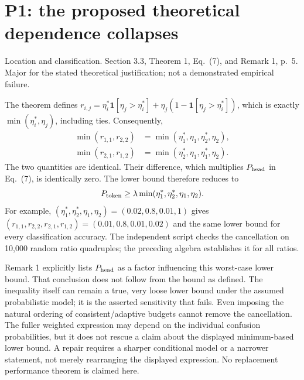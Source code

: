 \documentclass[10pt]{article}
\begin{document}
\section*{P1: the proposed theoretical dependence collapses}
Location and classification. Section 3.3, Theorem 1, Eq. (7), and Remark 1, p. 5. Major for the stated theoretical justification; not a demonstrated empirical failure.\par
The theorem defines \(r_{i,j}=\eta_i^*\mathbf1[\eta_j>\eta_i^*]+\eta_j(1-\mathbf1[\eta_j>\eta_i^*])\), which is exactly \(\min(\eta_i^*,\eta_j)\), including ties. Consequently, \[\begin{aligned}
\min(r_{1,1},r_{2,2})&=\min(\eta_1^*,\eta_1,\eta_2^*,\eta_2),\\
\min(r_{2,1},r_{1,2})&=\min(\eta_2^*,\eta_1,\eta_1^*,\eta_2).\end{aligned}\] The two quantities are identical. Their difference, which multiplies \(P_{\rm head}\) in Eq. (7), is identically zero. The lower bound therefore reduces to \[P_{\rm token}\ge \lambda\min(\eta_1^*,\eta_2^*,\eta_1,\eta_2).\] For example, \((\eta_1^*,\eta_2^*,\eta_1,\eta_2)=(0.02,0.8,0.01,1)\) gives \((r_{1,1},r_{2,2},r_{2,1},r_{1,2})=(0.01,0.8,0.01,0.02)\) and the same lower bound for every classification accuracy. The independent script checks the cancellation on 10,000 random ratio quadruples; the preceding algebra establishes it for all ratios.\par
Remark 1 explicitly lists \(P_{\rm head}\) as a factor influencing this worst-case lower bound. That conclusion does not follow from the bound as defined. The inequality itself can remain a true, very loose lower bound under the assumed probabilistic model; it is the asserted sensitivity that fails. Even imposing the natural ordering of consistent/adaptive budgets cannot remove the cancellation. The fuller weighted expression may depend on the individual confusion probabilities, but it does not rescue a claim about the displayed minimum-based lower bound. A repair requires a sharper conditional model or a narrower statement, not merely rearranging the displayed expression. No replacement performance theorem is claimed here.\par
\end{document}
